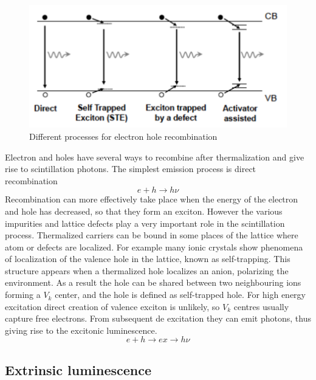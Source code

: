 \begin{figure}[htbp]
\centering
\includegraphics[width=12cm]{../Pictures/Chapter_2/traps.pdf}
\caption[Electron hole recombination]{Different processes for electron hole recombination}
\label{fig:traps}
\end{figure}
Electron and holes have several ways to recombine after thermalization and give rise to scintillation photons.
The simplest emission process is direct recombination
\begin{equation}
e + h \rightarrow h\nu
\end{equation}
Recombination can more effectively take place when the energy of the electron and hole has decreased, so that they form an exciton. 
However the various impurities and lattice defects play a very important role in the scintillation process. Thermalized carriers can be bound in some places of the lattice where atom or defects are localized. 
For example many ionic crystals show phenomena of localization of the valence hole in the lattice, known as self-trapping. This structure appears when a thermalized hole localizes an anion, polarizing the environment. As a result the hole can be shared between two neighbouring ions forming a $V_{k}$ center, and the hole is defined as self-trapped hole. For high energy excitation direct creation of valence exciton is unlikely, so $V_{k}$ centres usually capture free electrons. From subsequent de excitation they can emit photons, thus giving rise to the excitonic luminescence.
\begin{equation} 
e + h \rightarrow ex \rightarrow h\nu
\end{equation}

\subsection{Extrinsic luminescence}

